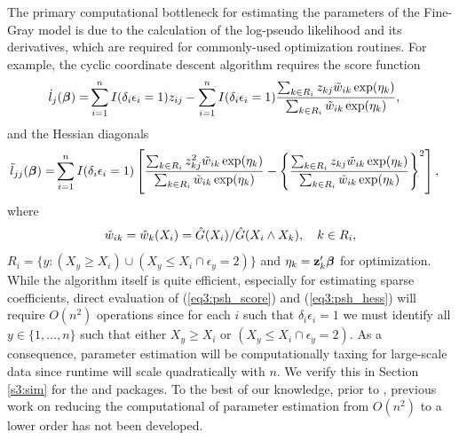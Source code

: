 The primary computational bottleneck for estimating the parameters of the Fine-Gray model is due to the calculation of the log-pseudo likelihood and its derivatives, which are required for commonly-used optimization routines. For example, the cyclic coordinate descent algorithm requires the score function
 \begin{align}
\label{eq3:psh_score}
\dot{l}_j(\bm \beta) = & \sum_{i=1}^n I(\delta_i\epsilon_i = 1) z_{ij} - \sum_{i = 1}^n I(\delta_i\epsilon_i = 1) \frac{ \sum_{k \in R_i} z_{kj} \tilde{w}_{ik}  \exp(\eta_k)}{\sum_{k \in R_i} \tilde{w}_{ik} \exp(\eta_k)}, 
\end{align}
and the Hessian diagonals
\begin{align}
\label{eq3:psh_hess}
\ddot{l}_{jj}(\bm \beta) = & \sum_{i=1}^n I(\delta_i\epsilon_i = 1) \left[ \frac{ \sum_{k \in R_i} z_{kj}^2 \tilde{w}_{ik}  \exp(\eta_k)}{\sum_{k \in R_i} \tilde{w}_{ik} \exp(\eta_k)} -  \left\{ \frac{ \sum_{k \in R_i} z_{kj} \tilde{w}_{ik}  \exp(\eta_k)}{\sum_{k \in R_i} \tilde{w}_{ik} \exp(\eta_k)} \right\}^2 \right], 
\end{align}
where  $$\tilde{w}_{ik} = \hat{w}_k(X_i) = \hat{G}(X_i) / \hat{G}(X_i \wedge X_k), \quad k \in R_i,$$ 
$R_i = \{y:(X_y \geq X_i) \cup (X_y \leq X_i \cap \epsilon_y =  2)\}$ and
$\eta_k = \mathbf{z}_k^\prime\bm \beta$ for optimization. While the algorithm itself is quite efficient, especially for estimating sparse coefficients, direct evaluation of (\ref{eq3:psh_score}) and (\ref{eq3:psh_hess}) will require $O(n^2)$ operations since for each $i$ such that $\delta_i \epsilon_i = 1$ we must identify all $y \in \{1, \ldots, n\}$ such that either $X_y \geq X_i$ or $(X_y \leq X_i \cap \epsilon_y = 2)$. As a consequence, parameter estimation will be computationally taxing for large-scale data since runtime will scale quadratically with $n$. We verify this in Section \ref{s3:sim} for the  and  packages. To the best of our knowledge, prior to \cite{kawaguchi2019scalable}, previous work on reducing the computational of parameter estimation from $O(n^2)$ to a lower order has not been developed. 

